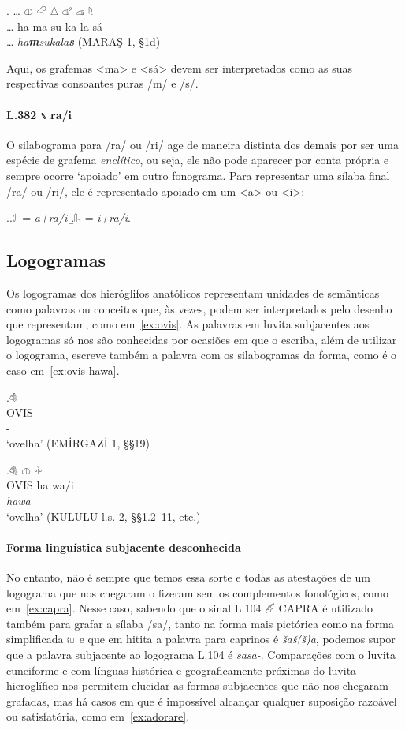 \exg. \ldots{} \Large 𔓷 \Large 𔒅 \Large 𔖢 \Large 𔗧 \Large 𔓊 \Large 𔗦\\
\ldots{} ha ma su ka la sá\\
\ldots{} \emph{ha\textbf{m}sukala\textbf{s}} (MARAŞ 1, §1d)

Aqui, os grafemas <ma> e <sá> devem ser interpretados como as suas respectivas
consoantes puras /m/ e /s/.

\paragraph{L.382 𔖲 ra\slash{}i} O silabograma para /ra/ ou /ri/ age de maneira
distinta dos demais por ser uma espécie de grafema \emph{enclítico}, ou seja,
ele não pode aparecer por conta própria e sempre ocorre `apoiado' em outro
fonograma.
Para representar uma sílaba final /ra/ ou /ri/, ele é representado apoiado em um
<a> ou <i>:

\ex.\a.{\Large 𔗸} = \emph{a+ra\slash{}i}
\b.{\Large 𔓰} = \emph{i+ra\slash{}i}.


\subsection{Logogramas}

Os logogramas dos hieróglifos anatólicos representam unidades de semânticas
como palavras ou conceitos que, às vezes, podem ser interpretados pelo
desenho que representam, como em~\ref{ex:ovis}.
As palavras em luvita subjacentes aos logogramas só nos são conhecidas por
ocasiões em que o escriba, além de utilizar o logograma, escreve também a
palavra com os silabogramas da forma, como é o caso em~\ref{ex:ovis-hawa}.

\exg.\label{ex:ovis}\Large 𔒇\\
OVIS\\
-\\
`ovelha' (EMİRGAZİ 1, §§19)

\exg.\label{ex:ovis-hawa}\Large 𔒇 \Large 𔓷 \Large 𔗬\\
OVIS ha wa/i\\
\emph{hawa}\\
`ovelha' (KULULU l.s. 2, §§1.2–11, etc.)


\paragraph{Forma linguística subjacente desconhecida}
No entanto, não é sempre que temos essa sorte e todas as atestações de um
logograma que nos chegaram o fizeram sem os complementos fonológicos, como
em~\ref{ex:capra}. Nesse caso, sabendo que o sinal L.104 𔑶 CAPRA é utilizado
também para grafar a sílaba /sa/, tanto na forma mais pictórica como na forma
simplificada 𔑷 e que em hitita a palavra para caprinos é \emph{šaš{(š)}a}, podemos
supor que a palavra subjacente ao logograma L.104 é \emph{sasa-}.
Comparações com o luvita cuneiforme e com línguas histórica e
geograficamente próximas do luvita hieroglífico nos permitem elucidar as formas
subjacentes que não nos chegaram grafadas, mas há casos em que é impossível
alcançar qualquer suposição razoável ou satisfatória, como em~\ref{ex:adorare}.

